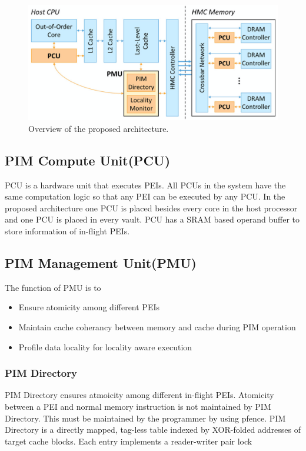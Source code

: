 \documentclass[a4paper,12pt, final]{report}
\begin{document}
\begin{figure}[h]
  \centering
  \includegraphics[width=0.8\linewidth]{PEI.png}
  \caption{Overview of the proposed architecture.}
\end{figure}

\subsection{PIM Compute Unit(PCU)}
PCU is a hardware unit that executes PEIs. All PCUs in the system have the same
computation logic so that any PEI can be executed by any PCU. In the proposed
architecture one PCU is placed besides every core in the host processor and one
PCU is placed in every vault. PCU has a SRAM based operand buffer to store
information of in-flight PEIs. 

\subsection{PIM Management Unit(PMU)}
The function of PMU is to 
\begin{itemize}
  \setlength\itemsep{0em}
    \item Ensure atomicity among different PEIs
    \item Maintain cache coherancy between memory and cache during PIM
      operation
    \item Profile data locality for locality aware execution
\end{itemize}

\subsubsection{PIM Directory}
PIM Directory ensures atmoicity among different in-flight PEIs. Atomicity
between a PEI and normal memory instruction is not maintained by PIM Directory.
This must be maintained by the programmer by using pfence. 
PIM Directory is a directly mapped, tag-less table indexed by XOR-folded addresses of 
target cache blocks. Each entry implements a reader-writer pair lock 
\end{document}
